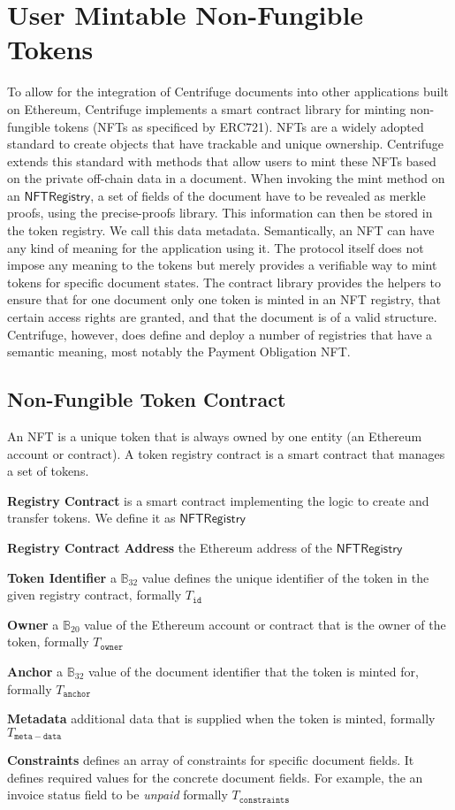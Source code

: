 \section{User Mintable Non-Fungible Tokens}
\label{sec:nft}
To allow for the integration of Centrifuge documents into other applications built on Ethereum, Centrifuge implements a smart contract library for minting non-fungible tokens (NFTs as specificed by ERC721). NFTs are a widely adopted standard to create objects that have trackable and unique ownership. Centrifuge extends this standard with methods that allow users to mint these NFTs based on the private off-chain data in a document. When invoking the mint method on an $\mathsf{NFTRegistry}$, a set of fields of the document have to be revealed as merkle proofs, using the precise-proofs library. This information can then be stored in the token registry. We call this data metadata. Semantically, an NFT can have any kind of meaning for the application using it. The protocol itself does not impose any meaning to the tokens but merely provides a verifiable way to mint tokens for specific document states. The contract library provides the helpers to ensure that for one document only one token is minted in an NFT registry, that certain access rights are granted, and that the document is of a valid structure. Centrifuge, however, does define and deploy a number of registries that have a semantic meaning, most notably the Payment Obligation NFT. %

\subsection{Non-Fungible Token Contract}
An NFT is a unique token that is always owned by one entity (an Ethereum account or contract). A token registry contract is a smart contract that manages a set of tokens.
\begin{description}
\item{\textbf{Registry Contract}} is a smart contract implementing the logic to create and transfer tokens. We define it as $\mathsf{NFTRegistry}$
\item{\textbf{Registry Contract Address}} the Ethereum address of the  $\mathsf{NFTRegistry}$ 
\item{\textbf{Token Identifier}} a $\mathbb{B}_{32}$ value defines the unique identifier of the token in the given registry contract, formally $T_{\mathtt{id}}$
\item{\textbf{Owner}} a $\mathbb{B}_{20}$ value of the Ethereum account or contract that is the owner of the token, formally $T_{\mathtt{owner}}$
\item{\textbf{Anchor}} a $\mathbb{B}_{32}$ value of the document identifier that the token is minted for, formally $T_{\mathtt{anchor}}$  %
\item{\textbf{Metadata}} additional data that is supplied when the token is minted, formally $T_{\mathtt{meta-data}}$
\item{\textbf{Constraints}} defines an array of constraints for specific document fields. It  defines required values for the concrete document fields. For example, the an invoice status field to be \textit{unpaid} formally $T_{\mathtt{constraints}}$
\end{description}
